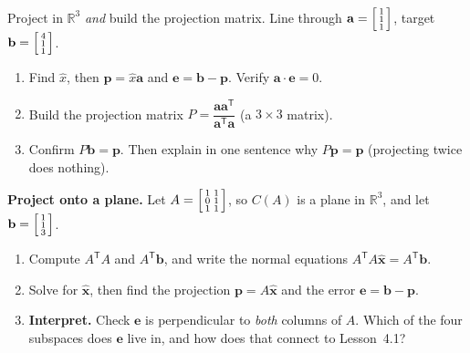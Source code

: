 \documentclass[10pt]{article}
\newcommand{\xx}{\mathbf{x}}
\newcommand{\bb}{\mathbf{b}}
\newcommand{\pp}{\mathbf{p}}
\newcommand{\ee}{\mathbf{e}}
\newcommand{\avec}{\mathbf{a}}
\newcommand{\T}{\mathsf{T}}
\begin{document}
\begin{tcolorbox}[colback=white, colframe=black!40, title=\textbf{Tier A --- Approaching Proficiency},
    fonttitle=\bfseries, arc=1.5mm, left=3mm, right=3mm, top=2mm, bottom=2mm, breakable]
Project in $\mathbb{R}^3$ \emph{and} build the projection matrix.
Line through $\avec=\begin{bsmallmatrix} 1\\1\\1 \end{bsmallmatrix}$, target $\bb=\begin{bsmallmatrix} 4\\1\\1 \end{bsmallmatrix}$.
\begin{enumerate}[leftmargin=1.7em, itemsep=9pt]
  \item Find $\hat{x}$, then $\pp=\hat{x}\avec$ and $\ee=\bb-\pp$. Verify $\avec\cdot\ee=0$. 
  \item Build the projection matrix $P=\dfrac{\avec\avec^{\T}}{\avec^{\T}\avec}$ (a $3\times3$ matrix).
  \item Confirm $P\bb=\pp$. Then explain in one sentence why $P\pp=\pp$ (projecting twice does nothing).
\end{enumerate}
\end{tcolorbox}

\begin{tcolorbox}[colback=white, colframe=black!40, title=\textbf{Tier E --- Extension},
    fonttitle=\bfseries, arc=1.5mm, left=3mm, right=3mm, top=2mm, bottom=2mm, breakable]
\textbf{Project onto a plane.} Let $A=\begin{bsmallmatrix} 1 & 1\\ 0 & 1\\ 1 & 1 \end{bsmallmatrix}$, so
$C(A)$ is a plane in $\mathbb{R}^3$, and let $\bb=\begin{bsmallmatrix} 1\\1\\3 \end{bsmallmatrix}$.
\begin{enumerate}[leftmargin=1.7em, itemsep=9pt]
  \item Compute $A^{\T}A$ and $A^{\T}\bb$, and write the normal equations $A^{\T}A\hat{\xx}=A^{\T}\bb$.
  \item Solve for $\hat{\xx}$, then find the projection $\pp=A\hat{\xx}$ and the error $\ee=\bb-\pp$.
  \item \textbf{Interpret.} Check $\ee$ is perpendicular to \emph{both} columns of $A$. Which of the four
        subspaces does $\ee$ live in, and how does that connect to Lesson~4.1? 
\end{enumerate}
\end{tcolorbox}
\end{document}
